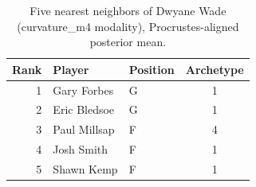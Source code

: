 \begin{table}[htbp]
  \centering\small
  \begin{tabular}{rllc}
    \toprule
    Rank & Player & Position & Archetype \\
    \midrule
    1 & Gary Forbes & G & 1 \\
    2 & Eric Bledsoe & G & 1 \\
    3 & Paul Millsap & F & 4 \\
    4 & Josh Smith & F & 1 \\
    5 & Shawn Kemp & F & 1 \\
    \bottomrule
  \end{tabular}
  \caption{Five nearest neighbors of Dwyane Wade (curvature_m4 modality), Procrustes-aligned posterior mean.}
  \label{tab:Dwyane_Wade_neighbors_curvature_m4}
\end{table}

